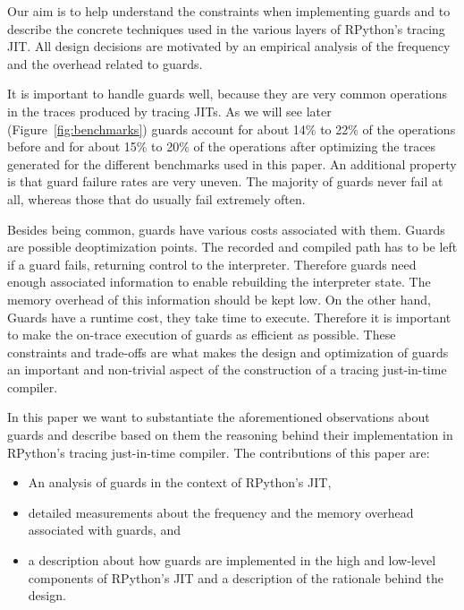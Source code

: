 \documentclass[10pt,preprint]{sigplanconf}
\begin{document}
Our aim is to help understand the constraints when implementing guards
and to describe the concrete techniques used in the various layers of RPython's
tracing JIT. All design decisions are motivated by an empirical analysis of the
frequency and the overhead related to guards.

It is important to handle guards well, because they are very common operations
in the traces produced by tracing JITs. As we will see later (Figure~\ref{fig:benchmarks})
guards account for about 14\% to 22\% of the
operations before and for about 15\% to 20\% of the operations after optimizing
the traces generated for the different benchmarks used in this paper. An
additional property is that guard failure rates are very uneven. The majority
of guards never fail at all, whereas those that do usually fail extremely
often.

Besides being common, guards have various costs associated with them.
Guards are possible deoptimization points. The recorded and
compiled path has to be left if a guard fails, returning control to the
interpreter. Therefore guards need enough associated information to enable
rebuilding the interpreter state. The memory overhead of this information
should be kept low. On the other hand,
Guards have a runtime cost, they take time to execute. Therefore it is
important to make the on-trace execution of guards as efficient as possible.
These constraints and trade-offs are what makes the design
and optimization of guards an important and non-trivial aspect of the construction
of a tracing just-in-time compiler.


In this paper we want to substantiate the aforementioned observations about guards and
describe based on them the reasoning behind their implementation in
RPython's tracing just-in-time compiler. The contributions of this paper are:
\begin{itemize}
  \item An analysis of guards in the context of RPython's JIT,
  \item detailed measurements about the frequency and the
  memory overhead associated with guards, and
  \item a description about how guards are implemented in the high\-
  and low-level components of RPython's JIT and a description of the rationale behind the design.
\end{itemize}
\end{document}
